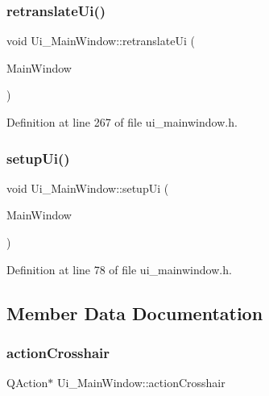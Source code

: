 \subsubsection{\texorpdfstring{retranslateUi()}{retranslateUi()}}
{\footnotesize\ttfamily void Ui\+\_\+\+Main\+Window\+::retranslate\+Ui (\begin{DoxyParamCaption}\item[{Q\+Main\+Window $\ast$}]{Main\+Window }\end{DoxyParamCaption})\hspace{0.3cm}{\ttfamily [inline]}}



Definition at line 267 of file ui\+\_\+mainwindow.\+h.

\mbox{\label{class_ui___main_window_acf4a0872c4c77d8f43a2ec66ed849b58}} 
\subsubsection{\texorpdfstring{setupUi()}{setupUi()}}
{\footnotesize\ttfamily void Ui\+\_\+\+Main\+Window\+::setup\+Ui (\begin{DoxyParamCaption}\item[{Q\+Main\+Window $\ast$}]{Main\+Window }\end{DoxyParamCaption})\hspace{0.3cm}{\ttfamily [inline]}}



Definition at line 78 of file ui\+\_\+mainwindow.\+h.



\subsection{Member Data Documentation}
\mbox{\label{class_ui___main_window_a3d6e96b03d68075ee7646a117bf8056d}} 
\subsubsection{\texorpdfstring{actionCrosshair}{actionCrosshair}}
{\footnotesize\ttfamily Q\+Action$\ast$ Ui\+\_\+\+Main\+Window\+::action\+Crosshair}




